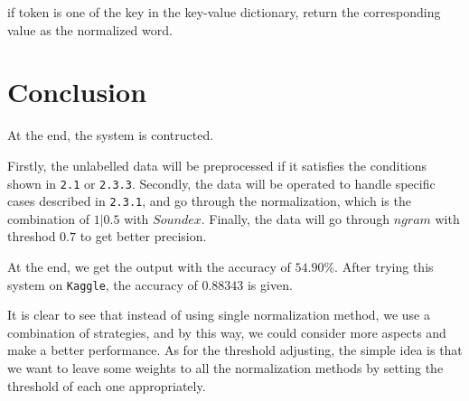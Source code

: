 \documentclass[11pt]{article}
\begin{document}
if token is one of the key in the key-value dictionary,
return the corresponding value as the normalized word.


\section{Conclusion}
At the end, the system is contructed.

Firstly, the unlabelled data will be preprocessed
if it satisfies the conditions
shown in \texttt{2.1} or \texttt{2.3.3}.
Secondly, the data will be operated to handle specific cases
described in \texttt{2.3.1},
and go through the normalization,
which is the combination of $1|0.5$ with $Soundex$.
Finally, the data will go through $ngram$ with threshod $0.7$
to get better precision.

At the end, we get the output with the accuracy of $54.90\%$.
After trying this system on \texttt{Kaggle}, the accuracy of $0.88343$ is given.

It is clear to see that instead of using single normalization method,
we use a combination of strategies, and by this way, we could consider more
aspects and make a better performance.
As for the threshold adjusting, the simple idea is that we want to leave some
weights to all the normalization methods by setting the threshold of each one
appropriately.


\end{document}
